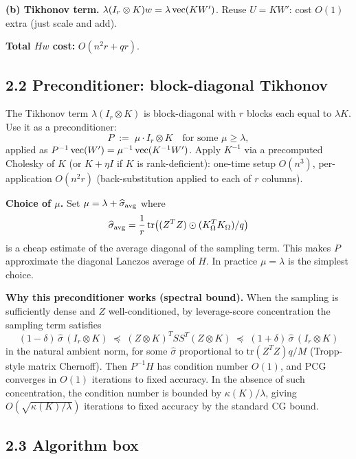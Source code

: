 \textbf{(b) Tikhonov term.}  $\lambda(I_r\otimes K)w = \lambda\operatorname{vec}(KW')$.  Reuse $U=KW'$: cost $O(1)$ extra (just scale and add).

\medskip
\noindent\textbf{Total $Hw$ cost:} $O(n^2 r + qr)$.

\subsection*{2.2 Preconditioner: block-diagonal Tikhonov}

The Tikhonov term $\lambda(I_r\otimes K)$ is block-diagonal with $r$ blocks each equal to $\lambda K$.  Use it as a preconditioner:
\[
P \;:=\; \mu\cdot I_r\otimes K\quad\text{for some }\mu\geq\lambda,
\]
applied as $P^{-1}\operatorname{vec}(W')=\mu^{-1}\operatorname{vec}(K^{-1}W')$.  Apply $K^{-1}$ via a precomputed Cholesky of $K$ (or $K+\eta I$ if $K$ is rank-deficient): one-time setup $O(n^3)$, per-application $O(n^2 r)$ (back-substitution applied to each of $r$ columns).

\textbf{Choice of $\mu$.}  Set $\mu=\lambda + \widehat{\sigma}_{\rm avg}$ where
\[
\widehat\sigma_{\rm avg}=\frac{1}{r}\,\mathrm{tr}\bigl((Z^TZ)\odot(K_{\Omega}^TK_{\Omega})/q\bigr)
\]
is a cheap estimate of the average diagonal of the sampling term.  This makes $P$ approximate the diagonal Lanczos average of $H$.  In practice $\mu=\lambda$ is the simplest choice.

\textbf{Why this preconditioner works (spectral bound).}  When the sampling is sufficiently dense and $Z$ well-conditioned, by leverage-score concentration the sampling term satisfies
\[
(1-\delta)\,\widehat\sigma\,(I_r\otimes K)\;\preceq\;(Z\otimes K)^T SS^T(Z\otimes K)\;\preceq\;(1+\delta)\,\widehat\sigma\,(I_r\otimes K)
\]
in the natural ambient norm, for some $\widehat\sigma$ proportional to $\mathrm{tr}(Z^TZ)q/M$ (Tropp-style matrix Chernoff).  Then $P^{-1}H$ has condition number $O(1)$, and PCG converges in $O(1)$ iterations to fixed accuracy.  In the absence of such concentration, the condition number is bounded by $\kappa(K)/\lambda$, giving $O(\sqrt{\kappa(K)/\lambda})$ iterations to fixed accuracy by the standard CG bound.

\subsection*{2.3 Algorithm box}

